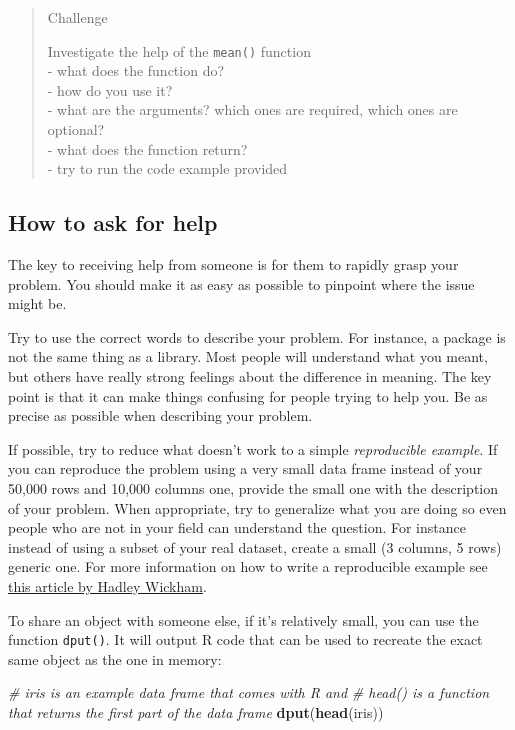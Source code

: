 \documentclass[
]{book}
\newenvironment{Shaded}{\begin{snugshade}}{\end{snugshade}}
\newcommand{\CommentTok}[1]{\textcolor[rgb]{0.56,0.35,0.01}{\textit{#1}}}
\newcommand{\FunctionTok}[1]{\textcolor[rgb]{0.13,0.29,0.53}{\textbf{#1}}}
\newcommand{\NormalTok}[1]{#1}
\begin{document}
\begin{quote}
Challenge

Investigate the help of the \texttt{mean()} function\\
- what does the function do?\\
- how do you use it?\\
- what are the arguments? which ones are required, which ones are optional?\\
- what does the function return?\\
- try to run the code example provided
\end{quote}

\subsection{How to ask for help}\label{how-to-ask-for-help}

The key to receiving help from someone is for them to rapidly grasp your
problem. You should make it as easy as possible to pinpoint where the issue
might be.

Try to use the correct words to describe your problem. For instance, a package
is not the same thing as a library. Most people will understand what you meant,
but others have really strong feelings about the difference in meaning. The key
point is that it can make things confusing for people trying to help you. Be as
precise as possible when describing your problem.

If possible, try to reduce what doesn't work to a simple \emph{reproducible
example}. If you can reproduce the problem using a very small data frame
instead of your 50,000 rows and 10,000 columns one, provide the small one with
the description of your problem. When appropriate, try to generalize what you
are doing so even people who are not in your field can understand the
question. For instance instead of using a subset of your real dataset, create a
small (3 columns, 5 rows) generic one. For more information on how to write a
reproducible example see \href{http://adv-r.had.co.nz/Reproducibility.html}{this article by Hadley Wickham}.

To share an object with someone else, if it's relatively small, you can use the
function \texttt{dput()}. It will output R code that can be used to recreate the exact
same object as the one in memory:

\begin{Shaded}
\begin{Highlighting}[]
\CommentTok{\# iris is an example data frame that comes with R and }
\CommentTok{\# head() is a function that returns the first part of the data frame}
\FunctionTok{dput}\NormalTok{(}\FunctionTok{head}\NormalTok{(iris)) }
\end{Highlighting}
\end{Shaded}
\end{document}
